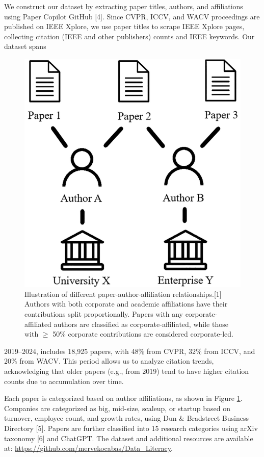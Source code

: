 \documentclass{article}
\begin{document}
We construct our dataset by extracting paper titles, authors, and affiliations using Paper Copilot GitHub [4]. Since CVPR, ICCV, and WACV proceedings are published on IEEE Xplore, we use paper titles to scrape IEEE Xplore pages, collecting citation (IEEE  and other publishers) counts and IEEE keywords. Our dataset spans 
\begin{figure}
\centering
\vspace{-10pt}
\includegraphics[width=.95\linewidth]{report/images/affiliation-combination.png}
\caption{Illustration of different paper-author-affiliation relationships.[1] Authors with both corporate and academic affiliations have their contributions split proportionally. Papers with any corporate-affiliated authors are classified as corporate-affiliated, while those with $\geq$ 50\% corporate contributions are considered corporate-led.}
\label{fig:affiliation-combination}
\vspace{-20pt}
\end{figure}
2019–2024, includes 18,925 papers, with 48\% from CVPR, 32\% from ICCV, and 20\% from WACV. This period allows us to analyze citation trends, acknowledging that older papers (e.g., from 2019) tend to have higher citation counts due to accumulation over time.

Each paper is categorized based on author affiliations, as shown in Figure \ref{fig:affiliation-combination}. Companies are categorized as big, mid-size, scaleup, or startup based on turnover, employee count, and growth rates, using Dun \& Bradstreet Business Directory [5]. Papers are further classified into 15 research categories using arXiv taxonomy [6] and ChatGPT. The dataset and additional resources are available at: \url{https://github.com/mervekocabas/Data_Literacy}.
\end{document}
